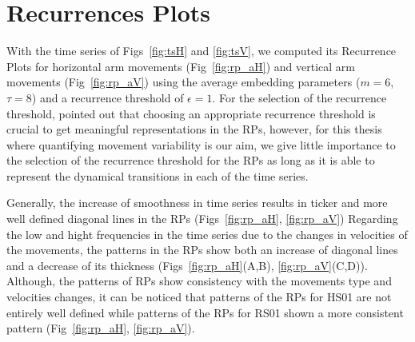 \section{Recurrences Plots}
With the time series of Figs~\ref{fig:tsH} and \ref{fig:tsV}, 
we computed its Recurrence Plots for horizontal arm movements 
(Fig~\ref{fig:rp_aH}) and vertical arm movements (Fig~\ref{fig:rp_aV}) 
using the average embedding parameters ($m=6$, $\tau=8$) and a recurrence 
threshold of $\epsilon=1$. For the selection of the recurrence threshold,
\cite{marwan2011} pointed out that choosing an appropriate 
recurrence threshold is crucial to get meaningful representations in the RPs, 
however, for this thesis where quantifying movement variability is our aim,
we give little importance to the selection of the recurrence threshold 
for the RPs as long as it is able to represent the dynamical transitions 
in each of the time series.

Generally, the increase of smoothness in time series results in ticker 
and more well defined diagonal lines in the RPs 
(Figs~\ref{fig:rp_aH}, \ref{fig:rp_aV}) 
Regarding the low and hight frequencies in the time series due to the 
changes in velocities of the movements, the patterns in the RPs 
show both an increase of diagonal lines and a decrease of its thickness
(Figs~\ref{fig:rp_aH}(A,B), \ref{fig:rp_aV}(C,D)).
Although, the patterns of RPs show consistency with the movements type 
and velocities changes, it can be noticed that patterns of the RPs for 
HS01 are not entirely well defined while patterns of the RPs for RS01 
shown a more consistent pattern (Fig~\ref{fig:rp_aH}, \ref{fig:rp_aV}). 

